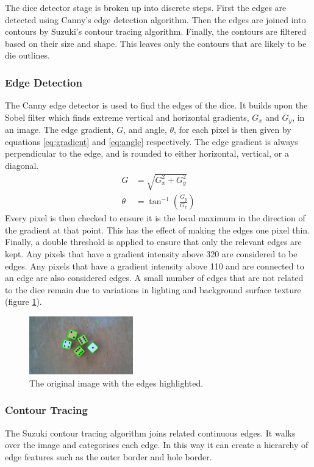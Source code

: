 \documentclass[conference]{IEEEtran}
\begin{document}
The dice detector stage is broken up into discrete steps.
First the edges are detected using Canny's edge detection algorithm.
Then the edges are joined into contours by Suzuki's contour tracing algorithm.
Finally, the contours are filtered based on their size and shape.
This leaves only the contours that are likely to be die outlines.

\subsubsection{Edge Detection}
The Canny edge detector \cite{Canny1986} is used to find the edges of the dice.
It builds upon the Sobel filter \cite{Sobel2014} which finds extreme vertical and horizontal gradients, $G_x$ and $G_y$, in an image.
The edge gradient, $G$, and angle, $\theta$, for each pixel is then given by equations \ref{eq:gradient} and \ref{eq:angle} respectively.
The edge gradient is always perpendicular to the edge, and is rounded to either horizontal, vertical, or a diagonal.
\begin{align}
	G &= \sqrt{G_x^2 + G_y^2} \label{eq:gradient} \\[1em]
	\theta &= \tan^{-1}\left(\frac{G_y}{G_x}\right) \label{eq:angle}
\end{align}
Every pixel is then checked to ensure it is the local maximum in the direction of the gradient at that point.
This has the effect of making the edges one pixel thin.
Finally, a double threshold is applied to ensure that only the relevant edges are kept.
Any pixels that have a gradient intensity above 320 are considered to be edges.
Any pixels that have a gradient intensity above 110 and are connected to an edge are also considered edges.
A small number of edges that are not related to the dice remain due to variations in lighting and background surface texture (figure \ref{fig:canny}).
\begin{figure}
	\centering
	\includegraphics[width=0.4\textwidth]{canny}
	\caption{The original image with the edges highlighted.}
	\label{fig:canny}
\end{figure}

\subsubsection{Contour Tracing}
The Suzuki contour tracing algorithm \cite{Suzuki1985} joins related continuous edges.
It walks over the image and categorises each edge. 
In this way it can create a hierarchy of edge features such as the outer border and hole border.
\end{document}
